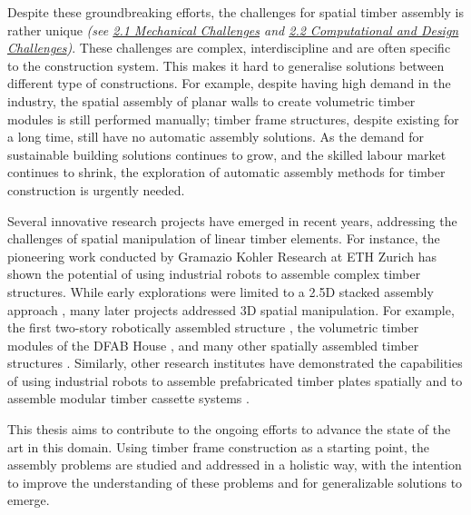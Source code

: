 Despite these groundbreaking efforts, the challenges for spatial timber assembly is rather unique \textit{(see \ul{2.1 Mechanical Challenges} and \ul{2.2 Computational and Design Challenges})}. These challenges are complex, interdiscipline and are often specific to the construction system. This makes it hard to generalise solutions between different type of constructions. For example, despite having high demand in the industry, the spatial assembly of planar walls to create volumetric timber modules is still performed manually; timber frame structures, despite existing for a long time, still have no automatic assembly solutions. As the demand for sustainable building solutions continues to grow, and the skilled labour market continues to shrink, the exploration of automatic assembly methods for timber construction is urgently needed. 

Several innovative research projects have emerged in recent years, addressing the challenges of spatial manipulation of linear timber elements. For instance, the pioneering work conducted by Gramazio Kohler Research at ETH Zurich has shown the potential of using industrial robots to assemble complex timber structures. While early explorations were limited to a 2.5D stacked assembly approach \parencite{apolinarskaSequentialRoof2016, gramaziokohlerresearchethzurichStackedPavilion2009, helmInSituFabricationMobile2014}, many later projects addressed 3D spatial manipulation. For example, the first two-story robotically assembled structure \parencite{eversmannRoboticPrefabricationTimber2017}, the volumetric timber modules of the DFAB House \parencite{adelDesignRoboticallyFabricated2018, thomaRoboticFabricationBespoke2018}, and many other spatially assembled timber structures \parencite{apolinarskaRoboticAssemblyTimber2021, eversmannRoboticPrefabricationTimber2017, helmAdditiveRoboticFabrication2016, helmreichRoboticAssemblyModular2022,willmannNewParadigmsAutomatic2016}. Similarly, other research institutes have demonstrated the capabilities of using industrial robots to assemble prefabricated timber plates spatially \parencite{robellerRoboticIntegralAttachment2017, rogeauRoboticAssemblyIntegrallyAttached2023} and to assemble modular timber cassette systems \parencite{alvarezBUGAWoodPavilion2019, claypoolAutomationDiscreteExploring2021}.

This thesis aims to contribute to the ongoing efforts to advance the state of the art in this domain. Using timber frame construction as a starting point, the assembly problems are studied and addressed in a holistic way, with the intention to improve the understanding of these problems and for generalizable solutions to emerge.

